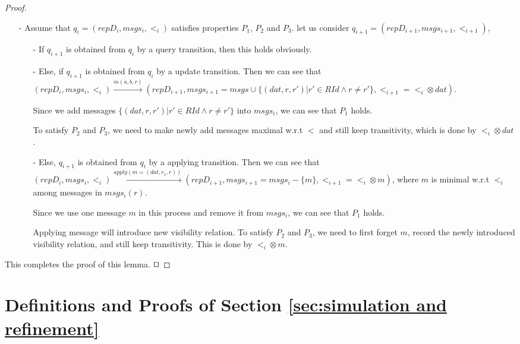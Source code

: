 \begin {proof}
\begin{itemize}
\item[-] Assume that $q_i=(repD_i,msgs_i,<_i)$ satisfies properties $P_1$, $P_2$ and $P_3$. let us consider $q_{i+1}= (repD_{i+1},msgs_{i+1},<_{i+1})$,

    \begin{itemize}
    \setlength{\itemsep}{0.5pt}
    \item[-] If $q_{i+1}$ is obtained from $q_i$ by a query transition, then this holds obviously.

    \item[-] Else, if $q_{i+1}$ is obtained from $q_i$ by a update transition. Then we can see that $(repD_i,msgs_i,<_i) {\xrightarrow{m(a,b,r)}} (repD_{i+1},msgs_{i+1}=msgs \cup \{ (dat,r,r') \vert  r' \in RId \wedge r \neq r' \},<_{i+1} = <_i \otimes dat)$.

        Since we add messages $\{ (dat,r,r') \vert  r' \in RId \wedge r \neq r' \}$ into $msgs_i$, we can see that $P_1$ holds.

        To satisfy $P_2$ and $P_3$, we need to make newly add messages maximal w.r.t $<$ and still keep transitivity, which is done by $<_i \otimes dat$.

    \item[-] Else, $q_{i+1}$ is obtained from $q_i$ by a applying transition. Then we can see that $(repD_i,msgs_i,<_i) {\xrightarrow{apply(m=(dat,r_1,r))}} (repD_{i+1},msgs_{i+1} = msgs_i - \{ m \}, <_{i+1} = <_i \otimes m )$, where $m$ is minimal w.r.t $<_i$ among messages in $msgs_i(r)$.

        Since we use one message $m$ in this process and remove it from $msgs_i$, we can see that $P_1$ holds.

        Applying message will introduce new visibility relation. To satisfy $P_2$ and $P_3$, we need to first forget $m$, record the newly introduced visibility relation, and still keep transitivity. This is done by $<_i \otimes m$.
    \end{itemize}
\end{itemize}

This completes the proof of this lemma. $\qed$
\end {proof}


















\section{Definitions and Proofs of Section \ref{sec:simulation and refinement}}
\label{sec:appendix definitions and proofs of section simulation and refinement}


